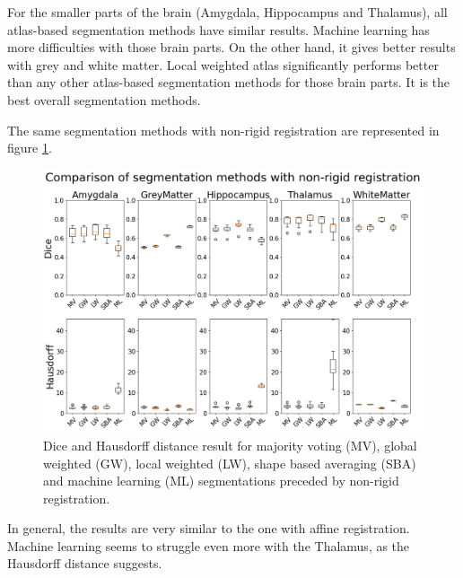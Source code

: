 For the smaller parts of the brain (Amygdala, Hippocampus and Thalamus), all atlas-based segmentation methods have similar results. Machine learning has more difficulties with those brain parts. On the other hand, it gives better results with grey and white matter. Local weighted atlas significantly performs better than any other atlas-based segmentation methods for those brain parts. It is the best overall segmentation methods.

The same segmentation methods with non-rigid registration are represented in figure \ref{fig:boxplotNR}.

\begin{figure}[h!]
	\centering
	\includegraphics[width = .48 \textwidth]{img/boxplot_NR_all}
	\caption{Dice and Hausdorff distance result for majority voting (MV), global weighted (GW), local weighted (LW), shape based averaging (SBA) and machine learning (ML) segmentations preceded by non-rigid registration.}
	\label{fig:boxplotNR}
\end{figure}

In general, the results are very similar to the one with affine registration. Machine learning seems to struggle even more with the Thalamus, as the Hausdorff distance suggests.
